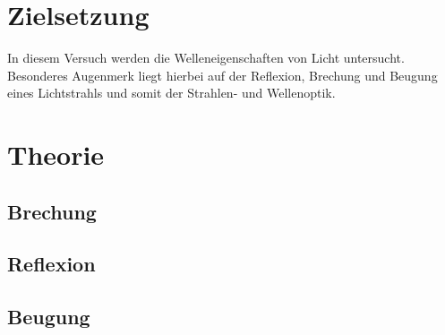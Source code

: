 \section{Zielsetzung}
\label{sec:Zielsetzung}

In diesem Versuch werden die Welleneigenschaften von Licht untersucht. Besonderes Augenmerk liegt hierbei auf der Reflexion, 
Brechung und Beugung eines Lichtstrahls und somit der Strahlen- und Wellenoptik.

\section{Theorie}
\label{sec:Theorie}

\subsection{Brechung}
\label{subsec:Brechung}

\subsection{Reflexion}
\label{subsec:Reflexion}



\subsection{Beugung}
\label{subsec:Beugung}
